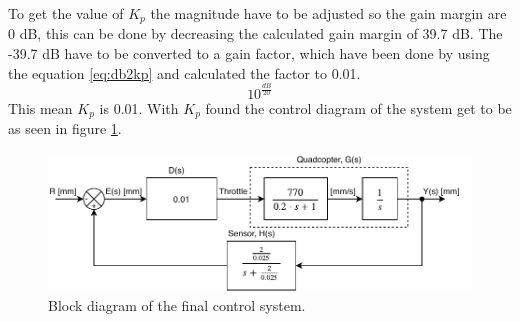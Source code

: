 \newline
To get the value of $K_p$ the magnitude have to be adjusted so the gain margin are 0 dB, this can be done by decreasing the calculated gain margin of 39.7 dB.
The -39.7 dB have to be converted to a gain factor, which have been done by using the equation \ref{eq:db2kp} and calculated the factor to 0.01.
\begin{equation}\label{eq:db2kp}
    10^\frac{dB}{20}
\end{equation}
This mean $K_p$ is 0.01.
With $K_p$ found the control diagram of the system get to be as seen in figure \ref{fig:dec_Final_block_diagram}.

\begin{figure}[H]
    \centering
    \includegraphics[width=\textwidth]{figures/ch_design/controller/FinalControlDiagram.pdf}
    \caption{Block diagram of the final control system.}
    \label{fig:dec_Final_block_diagram}
\end{figure}






